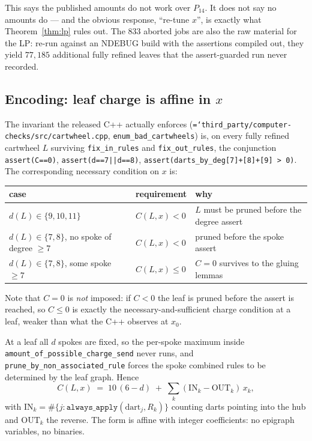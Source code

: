 \documentclass[11pt]{article}
\theoremstyle{definition}
\newcommand{\art}[1]{{\texttt{\hyphenchar\font=`\-\relax #1}}}
\begin{document}
This says the published amounts do not work over $P_{14}$. It does not say no
amounts do --- and the obvious response, ``re-tune $x$'', is exactly what
Theorem~\ref{thm:lp} rules out. The $833$ aborted jobs are also the raw material for
the LP: re-run against an NDEBUG build with the assertions compiled out, they yield
$77{,}185$ additional fully refined leaves that the assert-guarded run never
recorded.

\subsection{Encoding: leaf charge is affine in $x$}

The invariant the released C++ actually enforces
(\art{third\_party/computer-checks/src/cartwheel.cpp}, \texttt{enum\_bad\_cartwheels})
is, on every fully refined cartwheel $L$ surviving \texttt{fix\_in\_rules} and
\texttt{fix\_out\_rules}, the conjunction
\texttt{assert(C==0)}, \texttt{assert(d==7||d==8)},
\texttt{assert(darts\_by\_deg[7]+[8]+[9] > 0)}.
The corresponding necessary condition on $x$ is:

\begin{center}
\begin{tabular}{lll}
\toprule
case & requirement & why \\
\midrule
$d(L)\in\{9,10,11\}$ & $C(L,x) < 0$ & $L$ must be pruned before the degree assert \\
$d(L)\in\{7,8\}$, no spoke of degree $\ge 7$ & $C(L,x) < 0$ & pruned before the spoke assert \\
$d(L)\in\{7,8\}$, some spoke $\ge 7$ & $C(L,x) \le 0$ & $C=0$ survives to the gluing lemmas \\
\bottomrule
\end{tabular}
\end{center}

Note that $C=0$ is \emph{not} imposed: if $C<0$ the leaf is pruned before the assert
is reached, so $C \le 0$ is exactly the necessary-and-sufficient charge condition at
a leaf, weaker than what the C++ observes at $x_0$.

At a leaf all $d$ spokes are fixed, so the per-spoke maximum inside
\texttt{amount\_of\_possible\_charge\_send} never runs, and
\texttt{prune\_by\_non\_associated\_rule} forces the spoke combined rules to be
determined by the leaf graph. Hence
\begin{equation}
\label{eq:leafrow}
  C(L,x) \;=\; 10\,(6-d) \;+\; \sum_{k} (\mathrm{IN}_k - \mathrm{OUT}_k)\, x_k,
\end{equation}
with $\mathrm{IN}_k = \#\{j : \texttt{always\_apply}(\text{dart}_j, R_k)\}$ counting
darts pointing into the hub and $\mathrm{OUT}_k$ the reverse. The form is affine
with integer coefficients: no epigraph variables, no binaries.
\end{document}
